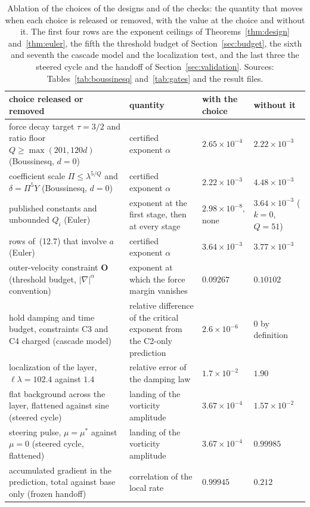 \documentclass[11pt]{article}
\theoremstyle{remark}
\begin{document}
\begin{table}[t]
\centering\footnotesize
\setlength{\tabcolsep}{3pt}
\begin{tabular}{@{}L{4.3cm}L{3.6cm}L{2.5cm}L{3.6cm}@{}}
\toprule
choice released or removed & quantity & with the choice & without it \\
\midrule
force decay target $\tau=3/2$ and ratio floor $Q\ge\max(201,120d)$ (Boussinesq, $d=0$) & certified exponent $\alpha$ & $2.65\times10^{-4}$ & $2.22\times10^{-3}$ \\
coefficient scale $\Pi\le\lambda^{5/Q}$ and $\delta=\Pi^{5}Y$ (Boussinesq, $d=0$) & certified exponent $\alpha$ & $2.22\times10^{-3}$ & $4.48\times10^{-3}$ \\
published constants and unbounded $Q_{i}$ (Euler) & exponent at the first stage, then at every stage & $2.98\times10^{-8}$, none & $3.64\times10^{-3}$ ($k=0$, $Q=51$) \\
rows of~(12.7) that involve $a$ (Euler) & certified exponent $\alpha$ & $3.64\times10^{-3}$ & $3.77\times10^{-3}$ \\
outer-velocity constraint \textbf{O} (threshold budget, $|\nabla|^{\alpha}$ convention) & exponent at which the force margin vanishes & $0.09267$ & $0.10102$ \\
hold damping and time budget, constraints C3 and C4 charged (cascade model) & relative difference of the critical exponent from the C2-only prediction & $2.6\times10^{-6}$ & $0$ by definition \\
localization of the layer, $\ell\lambda=102.4$ against $1.4$ & relative error of the damping law & $1.7\times10^{-2}$ & $1.90$ \\
flat background across the layer, flattened against sine (steered cycle) & landing of the vorticity amplitude & $3.67\times10^{-4}$ & $1.57\times10^{-2}$ \\
steering pulse, $\mu=\mu^{*}$ against $\mu=0$ (steered cycle, flattened) & landing of the vorticity amplitude & $3.67\times10^{-4}$ & $0.99985$ \\
accumulated gradient in the prediction, total against base only (frozen handoff) & correlation of the local rate & $0.99945$ & $0.212$ \\
\bottomrule
\end{tabular}
\caption{Ablation of the choices of the designs and of the checks: the quantity that moves when each choice is released
or removed, with the value at the choice and without it. The first four rows are the exponent ceilings of
Theorems~\ref{thm:design} and~\ref{thm:euler}, the fifth the threshold budget of Section~\ref{sec:budget}, the sixth and
seventh the cascade model and the localization test, and the last three the steered cycle and the handoff of
Section~\ref{sec:validation}. Sources: Tables~\ref{tab:boussinesq} and~\ref{tab:gates} and the result files.}\label{tab:ablation}
\end{table}
\end{document}
